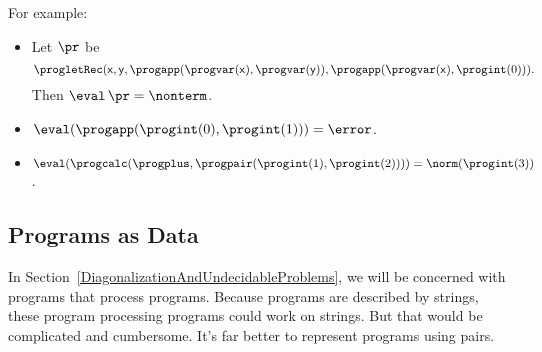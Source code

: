 For example:
\begin{itemize}
\item Let $\pr$ be
  \begin{displaymath}
    \progletRec(\mathsf{x}, \mathsf{y},
                \progapp(\progvar(\mathsf{x}), \progvar(\mathsf{y})),
                \progapp(\progvar(\mathsf{x}), \progint(0))) .
  \end{displaymath}
  Then $\eval\,\pr = \nonterm$.

\item $\eval(\progapp(\progint(0), \progint(1))) = \error$.

\item $\eval(\progcalc(\progplus, \progpair(\progint(1),\progint(2)))) =
  \norm(\progint(3))$.
\end{itemize}

\subsection{Programs as Data}

In Section~\ref{DiagonalizationAndUndecidableProblems}, we will be
concerned with programs that process programs.  Because programs
are described by strings, these program processing programs could
work on strings.  But that would be complicated and cumbersome.  It's
far better to represent programs using pairs.

